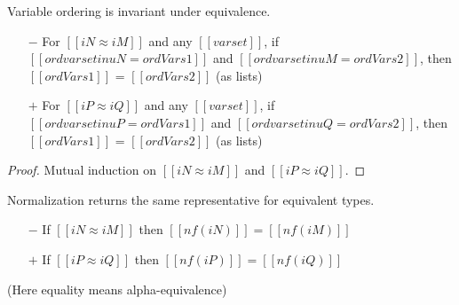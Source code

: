 \begin{lemma}
  \label{lemma:ord-completeness}
  Variable ordering is invariant under equivalence.

  \begin{itemize}
    \item[$-$] For $[[iN ≈ iM]]$ and any $[[varset]]$, if $[[ord varset in uN =
      ordVars1]]$ and $[[ord varset in uM = ordVars2]]$, then $[[ordVars1]]$ =
      $[[ordVars2]]$ (as lists)
    
    \item[$+$] For $[[iP ≈ iQ]]$ and any $[[varset]]$, if $[[ord varset in uP =
      ordVars1]]$ and $[[ord varset in uQ = ordVars2]]$, then $[[ordVars1]]$ =
      $[[ordVars2]]$ (as lists)
  \end{itemize}
\end{lemma}
\begin{proof}
  Mutual induction on $[[iN ≈ iM]]$ and $[[iP ≈ iQ]]$.
\end{proof}

\begin{lemma}
  Normalization returns the same representative for equivalent types.

  \begin{itemize}
  \item[$-$] If $[[iN ≈ iM]]$ then $[[nf(iN)]] = [[nf(iM)]]$
  \item[$+$] If $[[iP ≈ iQ]]$ then $[[nf(iP)]] = [[nf(iQ)]]$
  \end{itemize}
  (Here equality means alpha-equivalence)
\end{lemma}

